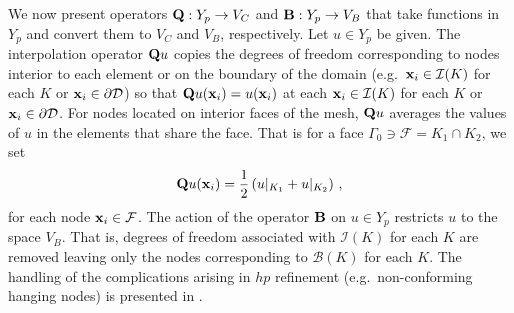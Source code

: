 \documentclass[../doc.tex]{subfiles}
\begin{document}
We now present operators $\boldsymbol{\mathrm{Q}} : Y_p \rightarrow V_C$ and $\boldsymbol{\mathrm{B}} : Y_p \rightarrow V_B$ that take functions in $Y_p$ and convert them to $V_C$ and $V_B$, respectively. Let $u \in Y_p$ be given. The interpolation operator $\boldsymbol{\mathrm{Q}}u$ copies the degrees of freedom corresponding to nodes interior to each element or on the boundary of the domain (e.g.~$\boldsymbol{\mathrm{x}}_i \in \mathcal{I}(K)$ for each $K$ or $\boldsymbol{\mathrm{x}}_i \in \partial\mathcal{D}$) so that $\boldsymbol{\mathrm{Q}}u(\boldsymbol{\mathrm{x}}_i) = u(\boldsymbol{\mathrm{x}}_i)$ at each $\boldsymbol{\mathrm{x}}_i \in \mathcal{I}(K)$ for each $K$ or $\boldsymbol{\mathrm{x}}_i \in \partial\mathcal{D}$. For nodes located on interior faces of the mesh, $\boldsymbol{\mathrm{Q}}u$ averages the values of $u$ in the elements that share the face. That is for a face $\Gamma_0 \ni \mathcal{F} = K_1 \cap K_2$, we set 
	\begin{equation}
		\boldsymbol{\mathrm{Q}}u(\boldsymbol{\mathrm{x}}_i) = \frac{1}{2}\left( u|_{K_1} + u|_{K_2} \right) \,,
	\end{equation}
for each node $\boldsymbol{\mathrm{x}}_i \in \mathcal{F}$. 
The action of the operator $\boldsymbol{\mathrm{B}}$ on $u\in Y_p$ restricts $u$ to the space $V_B$. That is, degrees of freedom associated with $\mathcal{I}(K)$ for each $K$ are removed leaving only the nodes corresponding to $\mathcal{B}(K)$ for each $K$. The handling of the complications arising in $hp$ refinement (e.g.~non-conforming hanging nodes) is presented in \cite{Pazner2021}. 
\end{document}
